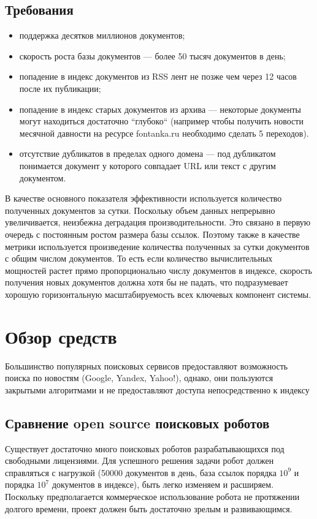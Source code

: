 \section{Требования}
\begin{itemize}
 \item поддержка десятков миллионов документов;
 \item скорость роста базы документов --- более 50 тысяч документов в день;
 \item попадение в индекс документов из RSS лент не позже чем через 12 часов после их публикации;
 \item попадение в индекс старых документов из архива --- некоторые документы могут находиться достаточно ``глубоко`` (например чтобы получить новости месячной давности на ресурсе fontanka.ru необходимо сделать 5 переходов).
 \item отсутствие дубликатов в пределах одного домена --- под дубликатом понимается документ у которого совпадает URL или текст с другим документом.
\end{itemize}

В качестве основного показателя эффективности используется количество полученных документов за сутки.
 Поскольку объем данных непрерывно увеличивается, неизбежна деградация производительности. Это связано в первую очередь с постоянным ростом размера базы ссылок.
 Поэтому также в качестве метрики используется произведение количества полученных за сутки документов с общим числом документов. То есть если количество вычислительных мощностей растет прямо пропорционально числу документов в индексе, скорость получения новых документов должна хотя бы не падать, что подразумевает хорошую горизонтальную масштабируемость всех ключевых компонент системы.



\chapter{Обзор средств}
Большинство популярных поисковых сервисов предоставляют возможность поиска по новостям (Google, Yandex, Yahoo!), однако, они пользуются закрытыми алгоритмами и не предоставляют доступа непосредственно к индексу
\section{Сравнение open source поисковых роботов}
Существует достаточно много поисковых роботов разрабатывающихся под свободными лицензиями. Для успешного решения задачи робот должен справляться с нагрузкой (50000 документов в день, база ссылок порядка $10^{9}$ и порядка $10^7$ документов в индексе), быть легко изменяем и расширяем. Поскольку предполагается коммерческое использование робота не протяжении долгого времени, проект должен быть достаточно зрелым и развивающимся.
